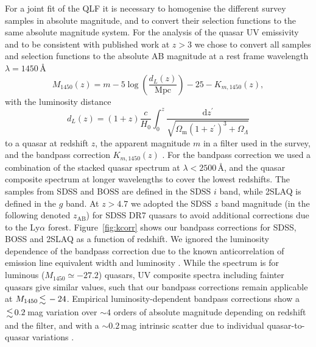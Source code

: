 \documentclass[fleqn,usenatbib]{mnras}
\begin{document}
For a joint fit of the QLF it is necessary to homogenise the different
survey samples in absolute magnitude, and to convert their selection
functions to the same absolute magnitude system. For the analysis of
the quasar UV emissivity and to be consistent with published work at
$z>3$ we chose to convert all samples and selection functions to the
absolute AB magnitude at a rest frame wavelength $\lambda=1450$\,\AA
\begin{equation}\label{eq:absmag}
  M_{1450}\left(z\right) = m-5\log{\left(\frac{d_L\left(z\right)}
    {\mathrm{Mpc}}\right)}-25-K_{m,1450}\left(z\right),
\end{equation}
with the luminosity distance
\begin{equation}
  d_L(z)=(1+z)\frac{c}{H_0}\int_0^z\frac{\mathrm{d}z^\prime}
  {\sqrt{\Omega_\mathrm{m}(1+z^\prime)^3+\Omega_\Lambda}}
  \label{eqn:dl}
\end{equation}
to a quasar at redshift $z$, the apparent magnitude $m$ in a filter used
in the survey, and the bandpass correction $K_{m,1450}\left(z\right)$
\citep{1956AJ.....61...97H, 1968ApJ...154...21O, 2000A&A...353..861W,
  2002astro.ph.10394H}. For the bandpass correction we used a
combination of the \citet{2015MNRAS.449.4204L} stacked quasar spectrum at
$\lambda<2500$\,\AA, and the \citet{2001AJ....122..549V} quasar
composite spectrum at longer wavelengths to cover the lowest
redshifts. The samples from SDSS and BOSS are defined in the SDSS $i$
band, while 2SLAQ is defined in the $g$ band. At $z>4.7$ we adopted
the SDSS $z$ band magnitude (in the following denoted $z_\mathrm{AB}$)
for SDSS DR7 quasars to avoid additional corrections due to the
Ly$\alpha$ forest. Figure~\ref{fig:kcorr} shows our bandpass
corrections for SDSS, BOSS and 2SLAQ as a function of redshift. We
ignored the luminosity dependence of the bandpass correction due to
the known anticorrelation of emission line equivalent width and
luminosity \citep{1977ApJ...214..679B}.  While the
\citet{2015MNRAS.449.4204L} spectrum is for luminous ($M_{1450}\simeq
-27.2$) quasars, UV composite spectra including fainter quasars
\citep{2002ApJ...565..773T, 2012ApJ...752..162S, 2014ApJ...794...75S}
give similar values, such that our bandpass corrections remain
applicable at $M_{1450}\la -24$. Empirical luminosity-dependent
bandpass corrections show a $\la 0.2$\,mag variation over $\sim 4$
orders of absolute magnitude depending on redshift and the filter, and
with a $\sim 0.2$\,mag intrinsic scatter due to individual quasar-to-quasar
variations \citep{2013ApJ...773...14R, 2013ApJ...768..105M,
  2013A&A...551A..29P}.
\end{document}
